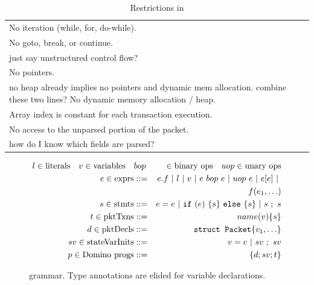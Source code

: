 \begin{table}
  \begin{tabular}{p{}}
    No iteration (while, for, do-while).\\
    No goto, break, or continue.\\ \ac{just say unstructured control flow?}\\
    No pointers.\\ \ac{no heap already implies no pointers and dynamic mem allocation. combine these two lines?}
    No dynamic memory allocation / heap.\\
    Array index is constant for each transaction execution.\\
    No access to the unparsed portion of the packet.\\
    \ac{how do I know which fields are parsed?}\\
  \end{tabular}
  \caption{Restrictions in \pktlanguage}
  \label{tab:restrict}
\end{table}

\begin{figure}
\newcommand{\sep}{~|~}
\begin{scriptsize}
\begin{eqnarray*}
l \in \text{literals} \quad v \in \text{variables} \quad &bop& \in \text{binary ops} \quad
uop \in \text{unary ops} \\
%
e \in \text{exprs} &::=& e.f \sep l \sep v \sep e~bop~e \sep uop~e \sep e[e] \sep \\
                   & &   f(e_1, \ldots) \\
%
s \in \text{stmts} &::=& e = e \sep {\tt if}~(e)~\{ s \}~{\tt else}~ \{ s \} \sep s~;~s \\
%
t \in \text{pktTxns} &::=& name(v) \{ s \} \\
%
%
d \in \text{pktDecls} &::=& \text{\tt struct Packet} \{ v_1, \ldots \} \\
%
sv \in \text{stateVarInits} &::=& v = e \sep sv~;~sv \\
%
p \in \text{\pktlanguage progs} &::=& \{ d ; sv; t \}
\end{eqnarray*}
\end{scriptsize}
\caption{\pktlanguage grammar. Type annotations are elided for variable declarations.}
\label{fig:grammar}
\end{figure}


